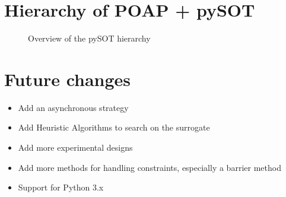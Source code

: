 \documentclass[]{article}
\begin{document}
\section{Hierarchy of POAP + pySOT}
\begin{figure}[!ht] 
	\centering
	\caption{Overview of the pySOT hierarchy} 
\end{figure}
\FloatBarrier

\section{Future changes}
\begin{itemize}
\item Add an asynchronous strategy
\item Add Heuristic Algorithms to search on the surrogate
\item Add more experimental designs
\item Add more methods for handling constraints, especially a barrier method
\item Support for Python 3.x
\end{itemize}
\end{document}
